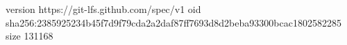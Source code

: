 version https://git-lfs.github.com/spec/v1
oid sha256:2385925234b45f7d9f79cda2a2daf87ff7693d8d2beba93300bcac1802582285
size 131168
